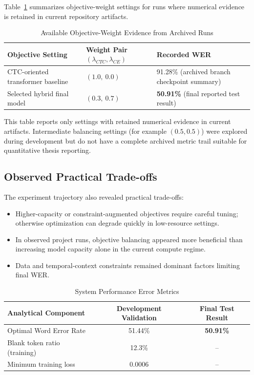 Table~\ref{tab:lambda_evidence} summarizes objective-weight settings for runs where numerical evidence is retained in current repository artifacts.

\begin{table}[H]
\centering
\caption{Available Objective-Weight Evidence from Archived Runs}
\label{tab:lambda_evidence}
\begingroup
\small
\setlength{\tabcolsep}{4pt}
\begin{tabularx}{\textwidth}{@{}p{4.3cm}p{3.4cm}X@{}}
\toprule
\textbf{Objective Setting} & \textbf{Weight Pair} $(\lambda_{CTC}, \lambda_{CE})$ & \textbf{Recorded WER} \\
\midrule
CTC-oriented transformer baseline & $(1.0,\ 0.0)$ & 91.28\% (archived branch checkpoint summary) \\
Selected hybrid final model & $(0.3,\ 0.7)$ & \textbf{50.91\%} (final reported test result) \\
\bottomrule
\end{tabularx}
\endgroup
\end{table}

\noindent This table reports only settings with retained numerical evidence in current artifacts. Intermediate balancing settings (for example $(0.5, 0.5)$) were explored during development but do not have a complete archived metric trail suitable for quantitative thesis reporting.

\subsection{Observed Practical Trade-offs}

The experiment trajectory also revealed practical trade-offs:
\begin{itemize}
    \item Higher-capacity or constraint-augmented objectives require careful tuning; otherwise optimization can degrade quickly in low-resource settings.
    \item In observed project runs, objective balancing appeared more beneficial than increasing model capacity alone in the current compute regime.
    \item Data and temporal-context constraints remained dominant factors limiting final WER.
\end{itemize}

\begin{table}[H]
\centering
\caption{System Performance Error Metrics}
\label{tab:perf_metrics}
\begin{tabular}{@{}lcc@{}}
\toprule
\textbf{Analytical Component} & \textbf{Development Validation} & \textbf{Final Test Result} \\
\midrule
Optimal Word Error Rate & 51.44\% & \textbf{50.91\%} \\
Blank token ratio (training) & 12.3\% & -- \\
Minimum training loss & 0.0006 & -- \\
\bottomrule
\end{tabular}
\end{table}

